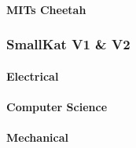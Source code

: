     \paragraph{MITs Cheetah}
    
    
\subsubsection{SmallKat V1 \& V2}
    \paragraph{Electrical}
    
    \paragraph{Computer Science}
    
    \paragraph{Mechanical}

